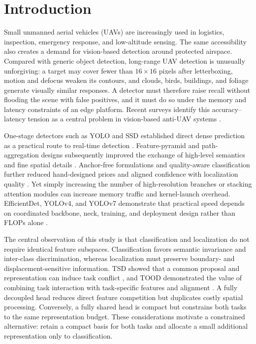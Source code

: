 \section{Introduction}

Small unmanned aerial vehicles (UAVs) are increasingly used in logistics, inspection, emergency response, and low-altitude sensing. The same accessibility also creates a demand for vision-based detection around protected airspace. Compared with generic object detection, long-range UAV detection is unusually unforgiving: a target may cover fewer than $16\times16$ pixels after letterboxing, motion and defocus weaken its contours, and clouds, birds, buildings, and foliage generate visually similar responses. A detector must therefore raise recall without flooding the scene with false positives, and it must do so under the memory and latency constraints of an edge platform. Recent surveys identify this accuracy--latency tension as a central problem in vision-based anti-UAV systems \cite{yasmeen2025review,wang2021smallobjectsurvey}.

One-stage detectors such as YOLO and SSD established direct dense prediction as a practical route to real-time detection \cite{redmon2016yolo,liu2016ssd}. Feature-pyramid and path-aggregation designs subsequently improved the exchange of high-level semantics and fine spatial details \cite{lin2017fpn,liu2018panet}. Anchor-free formulations and quality-aware classification further reduced hand-designed priors and aligned confidence with localization quality \cite{tian2019fcos,lin2017focal,li2020gfl}. Yet simply increasing the number of high-resolution branches or stacking attention modules can increase memory traffic and kernel-launch overhead. EfficientDet, YOLOv4, and YOLOv7 demonstrate that practical speed depends on coordinated backbone, neck, training, and deployment design rather than FLOPs alone \cite{tan2020efficientdet,bochkovskiy2020yolov4,wang2023yolov7}.

The central observation of this study is that classification and localization do not require identical feature subspaces. Classification favors semantic invariance and inter-class discrimination, whereas localization must preserve boundary- and displacement-sensitive information. TSD showed that a common proposal and representation can induce task conflict \cite{wu2020tsd}, and TOOD demonstrated the value of combining task interaction with task-specific features and alignment \cite{feng2021tood}. A fully decoupled head reduces direct feature competition but duplicates costly spatial processing. Conversely, a fully shared head is compact but constrains both tasks to the same representation budget. These considerations motivate a constrained alternative: retain a compact basis for both tasks and allocate a small additional representation only to classification.

